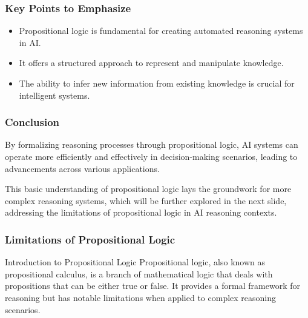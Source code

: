 \documentclass[aspectratio=169]{beamer}
\begin{document}
\begin{frame}[fragile]
    \frametitle{Key Points to Emphasize}
    \begin{itemize}
        \item Propositional logic is fundamental for creating automated reasoning systems in AI.
        \item It offers a structured approach to represent and manipulate knowledge.
        \item The ability to infer new information from existing knowledge is crucial for intelligent systems.
    \end{itemize}
\end{frame}

\begin{frame}[fragile]
    \frametitle{Conclusion}
    By formalizing reasoning processes through propositional logic, AI systems can operate more efficiently and effectively in decision-making scenarios, leading to advancements across various applications.
    
    This basic understanding of propositional logic lays the groundwork for more complex reasoning systems, which will be further explored in the next slide, addressing the limitations of propositional logic in AI reasoning contexts.
\end{frame}

\begin{frame}[fragile]
    \frametitle{Limitations of Propositional Logic}
    \begin{block}{Introduction to Propositional Logic}
        Propositional logic, also known as propositional calculus, is a branch of mathematical logic that deals with propositions that can be either true or false. It provides a formal framework for reasoning but has notable limitations when applied to complex reasoning scenarios.
    \end{block}
\end{frame}
\end{document}
